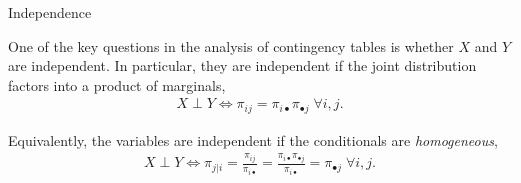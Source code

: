 \documentclass[aspectratio=169]{beamer}
\begin{document}
  
  
  \begin{frame}[t,allowframebreaks]{Independence}\label{independence}
  
  One of the key questions in the analysis of contingency tables is
  whether \(X\) and \(Y\) are independent. In particular, they are
  independent if the joint distribution factors into a product of
  marginals, \begin{align*}
  X \perp Y \iff \pi_{ij} = \pi_{i \bullet} \pi_{\bullet j} \; \forall i,j.
  \end{align*}
  
  Equivalently, the variables are independent if the conditionals are
  \emph{homogeneous}, \begin{align*}
  X \perp Y \iff \pi_{j|i} = \frac{\pi_{ij}}{\pi_{i \bullet}} = \frac{\pi_{i \bullet} \pi_{\bullet j}}{\pi_{i \bullet}} = \pi_{\bullet j} \; \forall i,j.
  \end{align*}
  \end{frame}
  
\end{document}
